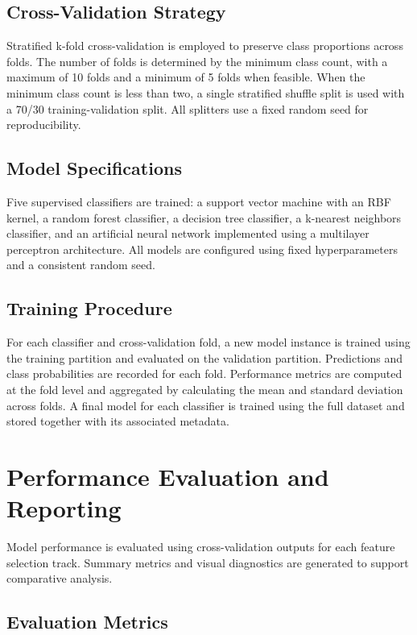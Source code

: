 \subsection{Cross-Validation Strategy}

Stratified k-fold cross-validation is employed to preserve class proportions across folds. The number of folds is determined by the minimum class count, with a maximum of 10 folds and a minimum of 5 folds when feasible. When the minimum class count is less than two, a single stratified shuffle split is used with a 70/30 training-validation split. All splitters use a fixed random seed for reproducibility.

\subsection{Model Specifications}

Five supervised classifiers are trained: a support vector machine with an RBF kernel, a random forest classifier, a decision tree classifier, a k-nearest neighbors classifier, and an artificial neural network implemented using a multilayer perceptron architecture. All models are configured using fixed hyperparameters and a consistent random seed.

\subsection{Training Procedure}

For each classifier and cross-validation fold, a new model instance is trained using the training partition and evaluated on the validation partition. Predictions and class probabilities are recorded for each fold. Performance metrics are computed at the fold level and aggregated by calculating the mean and standard deviation across folds. A final model for each classifier is trained using the full dataset and stored together with its associated metadata.

\section{Performance Evaluation and Reporting}

Model performance is evaluated using cross-validation outputs for each feature selection track. Summary metrics and visual diagnostics are generated to support comparative analysis.

\subsection{Evaluation Metrics}

